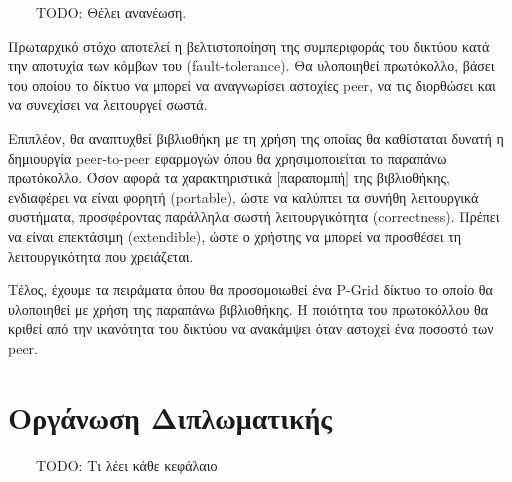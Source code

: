\ \ \ \ TODO: Θέλει ανανέωση.

Πρωταρχικό στόχο αποτελεί η βελτιστοποίηση της συμπεριφοράς του δικτύου 
κατά την αποτυχία των κόμβων του (fault-tolerance). Θα υλοποιηθεί 
πρωτόκολλο, βάσει του οποίου το δίκτυο να μπορεί να αναγνωρίσει αστοχίες 
peer, να τις διορθώσει και να συνεχίσει να λειτουργεί σωστά.

Επιπλέον, θα αναπτυχθεί βιβλιοθήκη με τη χρήση της οποίας θα καθίσταται 
δυνατή η δημιουργία peer-to-peer εφαρμογών όπου θα χρησιμοποιείται το 
παραπάνω πρωτόκολλο. Όσον αφορά τα χαρακτηριστικά $[$παραπομπή$]$ της 
βιβλιοθήκης, ενδιαφέρει να είναι φορητή (portable), ώστε να καλύπτει τα 
συνήθη λειτουργικά συστήματα, προσφέροντας παράλληλα σωστή 
λειτουργικότητα (correctness). Πρέπει να είναι επεκτάσιμη (extendible), 
ώστε ο χρήστης να μπορεί να προσθέσει τη λειτουργικότητα που χρειάζεται.

Τέλος, έχουμε τα πειράματα όπου θα προσομοιωθεί ένα P-Grid δίκτυο το 
οποίο θα υλοποιηθεί με χρήση της παραπάνω βιβλιοθήκης. Η ποιότητα του 
πρωτοκόλλου θα κριθεί από την ικανότητα του δικτύου να ανακάμψει όταν 
αστοχεί ένα ποσοστό των peer.

\section{Οργάνωση Διπλωματικής}

\ \ \ \ TODO: Τι λέει κάθε κεφάλαιο


